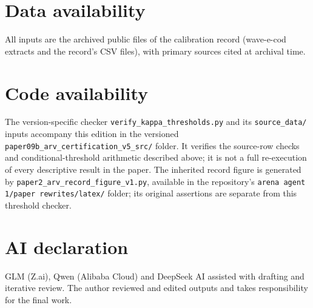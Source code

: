 \documentclass[10pt,twocolumn]{article}
\theoremstyle{plain}
\theoremstyle{remark}
\begin{document}
\section*{Data availability}
All inputs are the archived public files of the calibration record
(wave-e-cod extracts and the record's CSV files), with primary sources
cited at archival time.

\section*{Code availability}
The version-specific checker
\texttt{verify\_kappa\_thresholds.py} and its \texttt{source\_data/}
inputs accompany this edition in the versioned
\texttt{paper09b\_arv\_certification\_v5\_src/} folder. It verifies
the source-row checks and conditional-threshold arithmetic described
above; it is not a full re-execution of every descriptive result in the
paper. The inherited
record figure is generated by
\texttt{paper2\_arv\_record\_figure\_v1.py}, available in the repository's
\texttt{arena agent 1/paper rewrites/latex/} folder; its original assertions
are separate from this threshold checker.

\section*{AI declaration}
GLM (Z.ai), Qwen (Alibaba Cloud) and DeepSeek AI assisted with drafting
and iterative review. The author reviewed and edited outputs and takes
responsibility for the final work.
\end{document}
